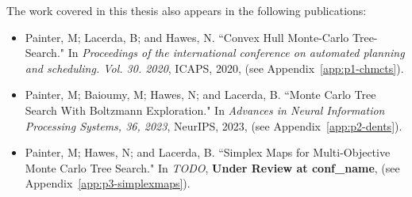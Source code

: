     The work covered in this thesis also appears in the following publications:
    \begin{itemize}
        \item Painter, M; Lacerda, B; and Hawes, N. ``Convex Hull Monte-Carlo Tree-Search." In \textit{Proceedings of the international conference on automated planning and scheduling. Vol. 30. 2020}, ICAPS, 2020, (see Appendix~\ref{app:p1-chmcts}).
        \item Painter, M; Baioumy, M; Hawes, N; and Lacerda, B.  ``Monte Carlo Tree Search With Boltzmann Exploration." In \textit{Advances in Neural Information Processing Systems, 36, 2023}, NeurIPS, 2023, (see Appendix~\ref{app:p2-dents}).
        \item Painter, M; Hawes, N; and Lacerda, B. ``Simplex Maps for Multi-Objective Monte Carlo Tree Search." In \textit{TODO}, \textbf{Under Review at conf\_name}, (see Appendix~\ref{app:p3-simplexmaps}).
    \end{itemize}